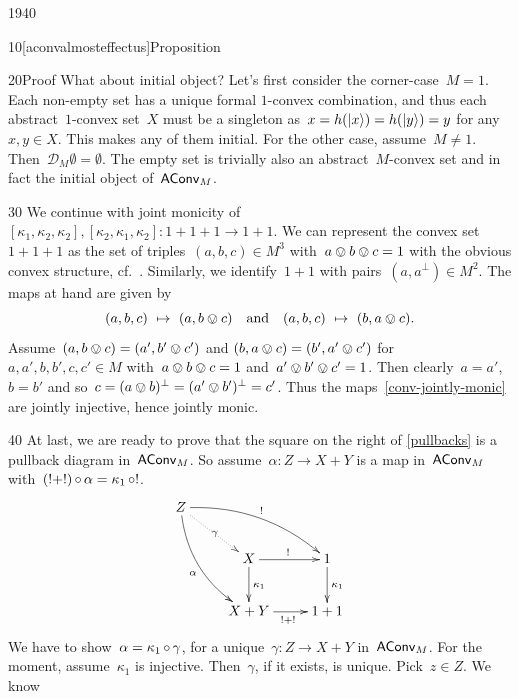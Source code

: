 \begin{parsec}{1940}
\begin{point}{10}[aconvalmosteffectus]{Proposition}
\begin{point}{20}{Proof}
What about initial object?
Let's first consider the corner-case~$M=1$.
Each non-empty set has a unique formal $1$-convex combination,
    and thus each abstract~$1$-convex set~$X$ must be a singleton
        as~$x = h(\ket{x}) = h(\ket{y}) = y$ for any~$x,y\in X$.
    This makes any of them initial.
For the other case, assume~$M \neq 1$.
Then~$\mathcal{D}_M \emptyset = \emptyset$.
    The empty set is trivially also an abstract~$M$-convex set
    and in fact the initial object of~$\mathsf{AConv}_M$.
\end{point}
\begin{point}{30}%
We continue with joint monicity
    of~$[\kappa_1,\kappa_2,\kappa_2],
    [\kappa_2,\kappa_1,\kappa_2]\colon 1+1+1 \to 1+1$.
We can represent the convex set~$1+1+1$
    as the set of triples~$(a,b,c) \in M^3$
    with~$a\ovee b \ovee c = 1$
    with the obvious convex structure,
    cf.~.
Similarly, we identify~$1+1$
    with pairs~$(a,a^\perp) \in M^2$.
    The maps at hand are given by
\begin{equation}\label{conv-jointly-monic}
    (a,b,c) \ \mapsto\  (a , b\ovee c)\quad \text{and} \quad
    (a,b,c) \ \mapsto\  (b, a\ovee c).
\end{equation}
Assume~$
(a, b \ovee c) = 
(a', b' \ovee c') $
and
$(b, a \ovee c) = 
(b', a' \ovee c') $
for~$a,a',b,b',c,c' \in M$ with~$a \ovee b \ovee c= 1$
and~$a' \ovee b' \ovee c'= 1$.
Then clearly~$a=a'$,~$b=b'$
    and so~$c = (a\ovee b)^\perp = (a' \ovee b')^\perp = c'$.
Thus the maps~\eqref{conv-jointly-monic} are jointly injective,
    hence jointly monic.
\end{point}
\begin{point}{40}%
At last, we are ready to prove that the square on the right of \eqref{pullbacks}
    is a pullback diagram in~$\mathsf{AConv}_M$.
So assume~$\alpha \colon Z \to X+Y$
    is a map in~$\mathsf{AConv}_M$
    with~$(!+!) \mathop{\circ} \alpha = \kappa_1 \mathop{\circ} !$.
\begin{equation*}
\xymatrix{
    Z \ar@/^1pc/[rrd]^{!}
        \ar@/_1pc/[rdd]_\alpha
        \ar@{.>}[rd]|\gamma\\
        &X \ar[r]^{!} \ar[d]^{\kappa_1}
        & 1\ar[d]^{\kappa_1} \\
        &X+Y\ar[r]_{!+!} & 1+1
    }
\end{equation*}
We have to show~$\alpha = \kappa_1 \mathop{\circ} \gamma$,
    for a unique~$\gamma\colon Z \to X+Y$ in~$\mathsf{AConv}_M$.
For the moment, assume~$\kappa_1$ is injective.
Then~$\gamma$, if it exists, is unique.
Pick~$z \in Z$.
We know
\begin{equation*}

\end{equation*}
\end{point}
\end{point}
\end{parsec}
